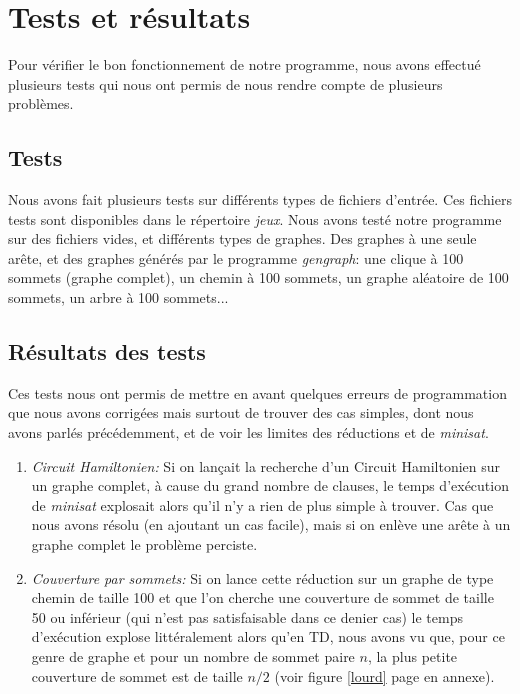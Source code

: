  \section{Tests et résultats}
  Pour vérifier le bon fonctionnement de notre programme, nous avons
  effectué plusieurs tests qui nous ont permis de nous rendre compte de
  plusieurs problèmes.

  \subsection{Tests}
  Nous avons fait plusieurs tests sur différents types de fichiers
  d'entrée. Ces fichiers tests sont disponibles dans le répertoire
  \emph{jeux}. \newline
  \indent Nous avons testé notre programme sur des fichiers vides,
  et différents types de graphes. Des graphes à une seule arête, et des
  graphes générés par le programme \emph{gengraph}: une clique à 100
  sommets (graphe complet), un chemin à 100 sommets, un graphe aléatoire
  de 100 sommets, un arbre à 100 sommets...

  \subsection{Résultats des tests}
  Ces tests nous ont permis de mettre en avant quelques erreurs de
  programmation que nous avons corrigées mais surtout de trouver des cas
  simples, dont nous avons parlés précédemment, et de voir les limites
  des réductions et de \emph{minisat}.
  \begin{enumerate}
   \item \emph{Circuit Hamiltonien:} Si on lançait la recherche d'un
	 Circuit Hamiltonien sur un graphe complet, à cause du grand
	 nombre de clauses, le temps d'exécution de \emph{minisat}
	 explosait alors qu'il n'y a rien de plus simple à trouver. Cas
	 que nous avons résolu (en ajoutant un cas facile), mais si on
	 enlève une arête à un graphe complet le problème perciste.
   \item \emph{Couverture par sommets:} Si on lance cette réduction sur
	 un graphe de type chemin de taille 100 et que l'on cherche une
	 couverture de sommet de taille 50 ou inférieur (qui n'est pas
	 satisfaisable dans ce denier cas) le temps d'exécution explose
	 littéralement alors qu'en TD, nous avons vu que, pour ce genre
	 de graphe et pour un nombre de sommet paire $n$, la plus petite
	 couverture de sommet est de taille $n/2$ (voir figure
	 \ref{lourd} page \pageref{lourd} en annexe). 
  \end{enumerate}

